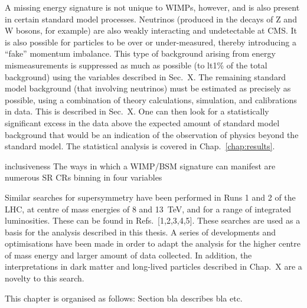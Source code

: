 A missing energy signature is not unique to WIMPs, however, and is also present 
in certain standard model processes. Neutrinos (produced in the decays of Z and 
W bosons, for example) are also weakly interacting and undetectable at CMS. It 
is also possible for particles to be over or under-measured, thereby 
introducing a ``fake'' momentum imbalance. This type of background arising from 
energy mismeasurements is suppressed as much as possible (to lt1\% of the total 
background) using the variables described in Sec.~X. The remaining standard 
model background (that involving neutrinos) must be estimated as precisely as 
possible, using a combination of theory calculations, simulation, and 
calibrations in data. This is described in Sec.~X. One can then look for a 
statistically significant excess in the data above the expected amount of 
standard model background that would be an indication of the observation of 
physics beyond the standard model. The statistical analysis is covered in 
Chap.~\ref{chap:results}.

inclusiveness
The ways in which a WIMP/BSM signature can manifest are numerous
SR
CRs
binning in four variables

Similar searches for supersymmetry have been performed in Runs 1 and 2 of the 
LHC, at centre of mass energies of 8 and 13~TeV, and for a range of 
integrated luminosities. These can be found in Refs.~[1,2,3,4,5]. These 
searches are used as a basis for the analysis described in this thesis. A 
series of developments and optimisations have been made in order to adapt the 
analysis for the higher centre of mass energy and larger amount of data 
collected. In addition, the interpretations in dark matter and long-lived 
particles described in Chap.~X are a novelty to this search.


This chapter is organised as follows: Section bla describes bla etc.

